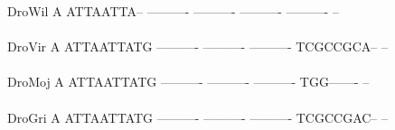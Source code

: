 \documentclass[11pt,twoside,reqno,a4paper]{article}
\begin{document}
{DroWil	A	ATTAATTA--	----------	----------	----------	----------	--\\
\hspace*{7\charwidth}\hspace*{1\charwidth}\hspace*{1\charwidth}\hspace*{1\charwidth}\hspace*{1\charwidth}\hspace*{1\charwidth}\hspace*{1\charwidth}\\
DroVir	A	ATTAATTATG	----------	----------	----------	TCGCCGCA--	--\\
\hspace*{7\charwidth}\hspace*{1\charwidth}\hspace*{1\charwidth}\hspace*{1\charwidth}\hspace*{1\charwidth}\hspace*{1\charwidth}\hspace*{1\charwidth}\\
DroMoj	A	ATTAATTATG	----------	----------	----------	TGG-------	--\\
\hspace*{7\charwidth}\hspace*{1\charwidth}\hspace*{1\charwidth}\hspace*{1\charwidth}\hspace*{1\charwidth}\hspace*{1\charwidth}\hspace*{1\charwidth}\\
DroGri	A	ATTAATTATG	----------	----------	----------	TCGCCGAC--	--\\
\hspace*{7\charwidth}\hspace*{1\charwidth}\hspace*{1\charwidth}\hspace*{1\charwidth}\hspace*{1\charwidth}\hspace*{1\charwidth}\hspace*{1\charwidth}\\
\\
}
\end{document}

